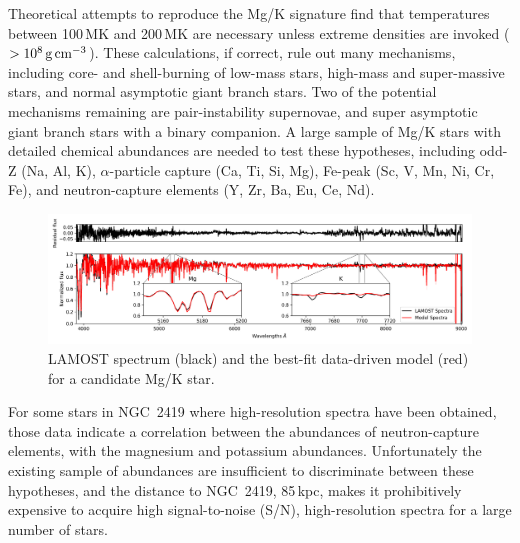 \documentclass[12pt]{report}
\begin{document}
Theoretical attempts to reproduce the Mg/K signature find that temperatures between 100\,MK and 200\,MK are necessary unless extreme densities are invoked ($>10^8\,{\rm g\,cm}^{-3}$). These calculations, if correct, rule out many mechanisms, including core- and shell-burning of low-mass stars, high-mass and super-massive stars, and normal asymptotic giant branch stars. Two of the potential mechanisms remaining are pair-instability supernovae, and super asymptotic giant branch stars with a binary companion. A large sample of Mg/K stars with detailed chemical abundances are needed to test these hypotheses, including odd-Z (Na, Al, K), $\alpha$-particle capture (Ca, Ti, Si, Mg), Fe-peak (Sc, V, Mn, Ni, Cr, Fe), and neutron-capture elements (Y, Zr, Ba, Eu, Ce, Nd). 
\setcounter{figure}{0}
\begin{figure}[h!]
	\centering\vspace{-1em}
	\includegraphics[width=\textwidth]{figures/posterchild.png}
	\vspace{-1em}
\caption{\small LAMOST spectrum (black) and the best-fit data-driven model (red) for a candidate Mg/K star.}\vspace{-2em}
	\label{fig:spectra}\end{figure}


For some  stars in NGC~2419 where high-resolution spectra have been obtained, those data indicate a correlation between the abundances of neutron-capture elements, with the magnesium and potassium abundances. Unfortunately the existing sample of abundances are insufficient to discriminate between these hypotheses, and the distance to NGC~2419, 85\,kpc, makes it prohibitively expensive to acquire high signal-to-noise (S/N), high-resolution spectra for a large number of stars.
\end{document}
